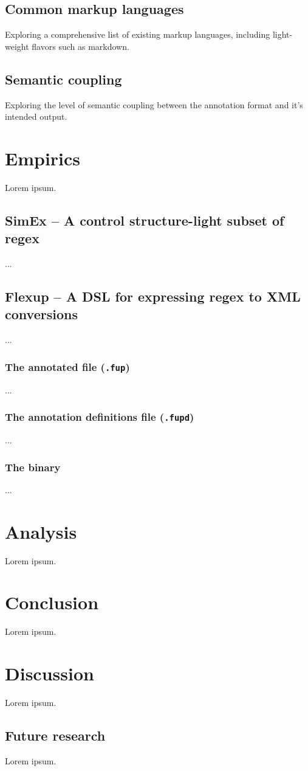 \documentclass{scrreprt}
\begin{document}
\section{Common markup languages}
Exploring a comprehensive list of existing markup languages, including light-weight flavors such as markdown.

\section{Semantic coupling}
Exploring the level of semantic coupling between the annotation format and it's intended output.





\chapter{Empirics}
Lorem ipsum.


\section{SimEx -- A control structure-light subset of regex}
...


\section{Flexup -- A DSL for expressing regex to XML conversions}
...

\subsection{The annotated file (\texttt{.fup})}
...

\subsection{The annotation definitions file (\texttt{.fupd})}
...

\subsection{The binary}
...





\chapter{Analysis}
Lorem ipsum.





\chapter{Conclusion}
Lorem ipsum.





\chapter{Discussion}
Lorem ipsum.

\section{Future research}
Lorem ipsum.
\end{document}
